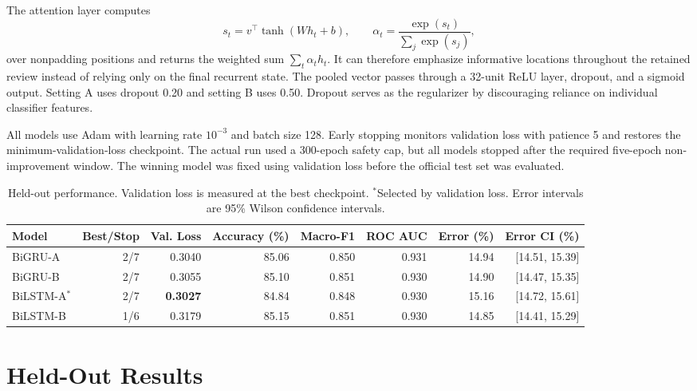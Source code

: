 \documentclass[conference]{IEEEtran}
\begin{document}
The attention layer computes
\begin{equation}
s_t=v^\top\tanh(Wh_t+b), \qquad
\alpha_t=\frac{\exp(s_t)}{\sum_j\exp(s_j)},
\end{equation}
over nonpadding positions and returns the weighted sum $\sum_t\alpha_t h_t$. It can therefore emphasize informative locations throughout the retained review instead of relying only on the final recurrent state. The pooled vector passes through a 32-unit ReLU layer, dropout, and a sigmoid output. Setting A uses dropout 0.20 and setting B uses 0.50. Dropout serves as the regularizer by discouraging reliance on individual classifier features.

All models use Adam with learning rate $10^{-3}$ and batch size 128. Early stopping monitors validation loss with patience 5 and restores the minimum-validation-loss checkpoint. The actual run used a 300-epoch safety cap, but all models stopped after the required five-epoch non-improvement window. The winning model was fixed using validation loss before the official test set was evaluated.

\begin{table}[!t]
\caption{Held-out performance. Validation loss is measured at the best checkpoint. $^\ast$Selected by validation loss. Error intervals are 95\% Wilson confidence intervals.}
\label{tab:results}
\centering
\small
\setlength{\tabcolsep}{4.2pt}
\begin{tabular}{lrrrrrrr}
\toprule
Model & Best/Stop & Val. Loss & Accuracy (\%) & Macro-F1 & ROC AUC & Error (\%) & Error CI (\%)\\
\midrule
BiGRU-A & 2/7 & 0.3040 & 85.06 & 0.850 & 0.931 & 14.94 & [14.51, 15.39]\\
BiGRU-B & 2/7 & 0.3055 & 85.10 & 0.851 & 0.930 & 14.90 & [14.47, 15.35]\\
BiLSTM-A$^\ast$ & 2/7 & \textbf{0.3027} & 84.84 & 0.848 & 0.930 & 15.16 & [14.72, 15.61]\\
BiLSTM-B & 1/6 & 0.3179 & 85.15 & 0.851 & 0.930 & 14.85 & [14.41, 15.29]\\
\bottomrule
\end{tabular}
\end{table}

\section{Held-Out Results}
\end{document}

